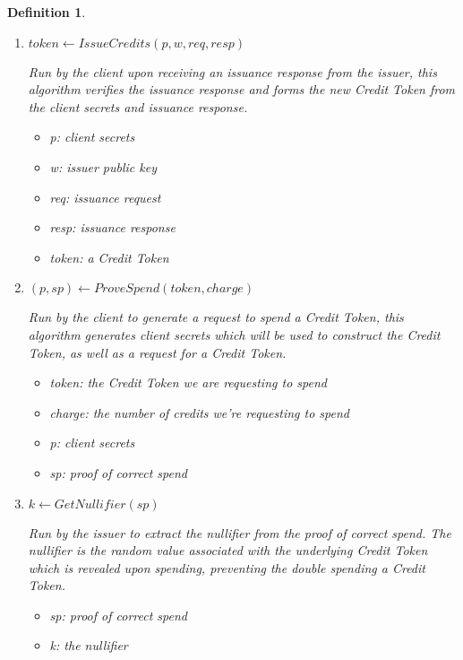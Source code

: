 \documentclass{article}
\newtheorem{definition}{Definition}
\begin{document}
\begin{definition}
\begin{enumerate}
    \item $token \leftarrow IssueCredits(p, w, req, resp)$

        Run by the client upon receiving an issuance response from the issuer,
        this algorithm verifies the issuance response and forms the new Credit
        Token from the client secrets and issuance response.

    \begin{itemize}
        \item p: client secrets
        \item w: issuer public key
        \item req: issuance request
        \item resp: issuance response
        \item token: a Credit Token
    \end{itemize}

    \item $(p, sp) \leftarrow ProveSpend(token, charge)$

        Run by the client to generate a request to spend a Credit Token, this
        algorithm generates client secrets which will be used to construct the
        Credit Token, as well as a request for a Credit Token.

    \begin{itemize}
        \item token: the Credit Token we are requesting to spend
        \item charge: the number of credits we're requesting to spend
        \item p: client secrets
        \item sp: proof of correct spend
    \end{itemize}

    \item $k \leftarrow GetNullifier(sp)$

        Run by the issuer to extract the nullifier from the proof of correct
        spend. The nullifier is the random value associated with the underlying
        Credit Token which is revealed upon spending, preventing the double
        spending a Credit Token.
     
    \begin{itemize}
        \item sp: proof of correct spend
        \item k: the nullifier
    \end{itemize}


\end{enumerate}
\end{definition}
\end{document}
